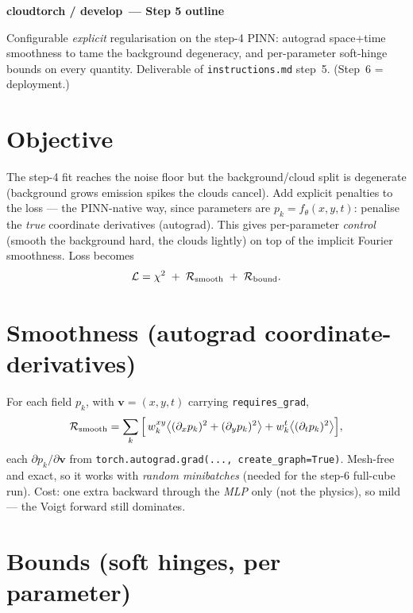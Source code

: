 \documentclass[10pt,a4paper]{article}
\newcommand{\co}[1]{{\small\texttt{#1}}}
\begin{document}
\small

{\sffamily\bfseries\large\color{acc} cloudtorch / develop\, --- Step 5 outline}

\vspace{1pt}
{\sffamily\color{gry}\footnotesize Configurable \emph{explicit} regularisation on the step-4 PINN: autograd space+time smoothness to tame the background degeneracy, and per-parameter soft-hinge bounds on every quantity. Deliverable of \co{instructions.md} step~5. (Step~6 = deployment.)}

\vspace{1pt}{\footnotesize\color{gry}\rule{\textwidth}{0.4pt}}

\section{Objective}

The step-4 fit reaches the noise floor but the background/cloud split is degenerate (background grows emission spikes the clouds cancel). Add explicit penalties to the loss --- the PINN-native way, since parameters are $p_k=f_\theta(x,y,t)$: penalise the \emph{true} coordinate derivatives (autograd). This gives per-parameter \emph{control} (smooth the background hard, the clouds lightly) on top of the implicit Fourier smoothness. Loss becomes
\[
\mathcal L=\chi^2 \;+\; \mathcal R_{\rm smooth}\;+\;\mathcal R_{\rm bound}.
\]

\section{Smoothness (autograd coordinate-derivatives)}

For each field $p_k$, with $\mathbf v=(x,y,t)$ carrying \co{requires\_grad},
\[
\mathcal R_{\rm smooth}=\sum_k \Big[\,w^{xy}_k\big\langle(\partial_x p_k)^2+(\partial_y p_k)^2\big\rangle
+w^{t}_k\big\langle(\partial_t p_k)^2\big\rangle\Big],
\]
each $\partial p_k/\partial\mathbf v$ from \co{torch.autograd.grad(...,\,create\_graph=True)}. Mesh-free and exact, so it works with \emph{random minibatches} (needed for the step-6 full-cube run). Cost: one extra backward through the \emph{MLP} only (not the physics), so mild --- the Voigt forward still dominates.

\section{Bounds (soft hinges, per parameter)}
\end{document}
